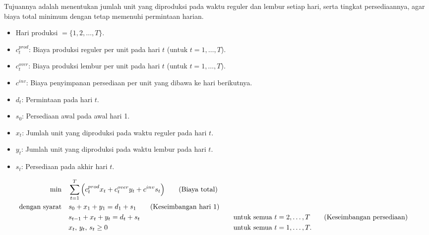 Tujuannya adalah menentukan jumlah unit yang diproduksi pada waktu reguler dan lembur setiap hari, serta tingkat persediaannya, agar biaya total minimum dengan tetap memenuhi permintaan harian.

\bigskip

\begin{itemize}
    \item Hari produksi \( = \{1, 2, \dots, T\}\).
\end{itemize}

\begin{itemize}
    \item \(c^{prod}_t\): Biaya produksi reguler per unit pada hari \(t\) (untuk \(t=1,\dots,T\)).
    \item \(c^{over}_{t}\): Biaya produksi lembur per unit pada hari \(t\) (untuk \(t=1,\dots,T\)).
    \item \(c^{inv}\): Biaya penyimpanan persediaan per unit yang dibawa ke hari berikutnya.
    \item \(d_t\): Permintaan pada hari \(t\).
    \item \(s_0\): Persediaan awal pada awal hari 1.
\end{itemize}

\begin{itemize}
    \item \(x_t\): Jumlah unit yang diproduksi pada waktu reguler pada hari \(t\).
    \item \(y_t\): Jumlah unit yang diproduksi pada waktu lembur pada hari \(t\).
    \item \(s_t\): Persediaan pada akhir hari \(t\).
\end{itemize}

\begin{align*}
\min \quad & \sum_{t=1}^{T} \Big( c^{prod}_t x_t + c^{over}_{t} y_t + c^{inv} s_t \Big)   \tag{Biaya total} \\
\mbox{dengan syarat}\quad        & s_0 + x_1 + y_1 = d_1 + s_1   \tag{Keseimbangan hari 1} \\
             & s_{t-1} + x_t + y_t = d_t + s_t &&\quad \mbox{untuk semua } t = 2,\dots,T   \tag{Keseimbangan persediaan} \\
             & x_t,\, y_t,\, s_t \ge 0 &&\quad \mbox{untuk semua } t = 1,\dots,T.
\end{align*}

\newpage

